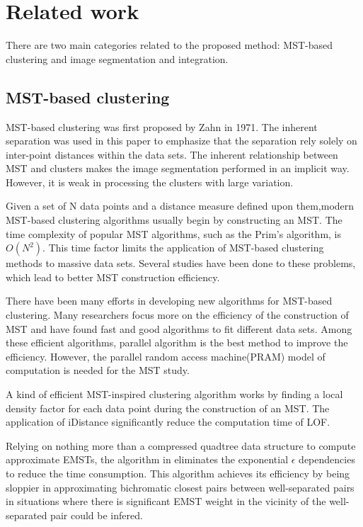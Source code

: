 \section{Related work}
  There are two main categories related to the proposed method: MST-based clustering and image segmentation and integration. 
	\subsection{MST-based clustering}
	  MST-based clustering was first proposed by Zahn in 1971\cite{Zahn1971Graph}. The inherent separation was used in this paper to emphasize that the separation rely solely on inter-point distances within the data sets. The inherent relationship between MST and clusters makes the image segmentation performed in an implicit way. However, it is weak in processing the clusters with large variation. 

	  Given a set of N data points and a distance measure defined upon them,modern MST-based clustering algorithms usually begin by constructing an MST. The time complexity of popular MST algorithms, such as the Prim's algorithm, is $O(N^2)$\cite{Cormen2009Introduction}. This time factor limits the application of MST-based clustering methods to massive data sets. Several studies have been done to these problems, which lead to better MST construction efficiency.

	  There have been many efforts in developing new algorithms for MST-based clustering. Many researchers focus more on the efficiency of the construction of MST and have found fast and good algorithms to fit different data sets. Among these efficient algorithms, parallel algorithm is the best method to improve the efficiency\cite{Chong2015An}. However, the parallel random access machine(PRAM) model of computation is needed for the MST study. 

      A kind of efficient MST-inspired clustering algorithm works by finding a local density factor for each data point during the construction of an MST\cite{Wang2013Enhancing}. The application of iDistance significantly reduce the computation time of LOF. 
	  
	  Relying on nothing more than a compressed quadtree data structure to compute approximate EMSTs, the algorithm in \cite{Arya2016A} eliminates the exponential $\epsilon$ dependencies to reduce the time consumption. This algorithm achieves its efficiency by being sloppier in approximating bichromatic closest pairs between well-separated pairs in situations where there is significant EMST weight in the vicinity of the well-separated pair could be infered. 
	  
